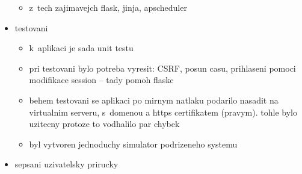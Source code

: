\begin{itemize}
\begin{itemize}
        \item z~tech zajimavejch flask, jinja, apscheduler
    \end{itemize}
    \item testovani
    \begin{itemize}
        \item k~aplikaci je sada unit testu
        \item pri testovani bylo potreba vyresit: CSRF, posun casu, prihlaseni pomoci modifikace session -- tady pomoh flaskc
        \item behem testovani se aplikaci po mirnym natlaku podarilo nasadit na virtualnim serveru, s~domenou a https certifikatem (pravym). tohle bylo uzitecny protoze to vodhalilo par chybek
        \item byl vytvoren jednoduchy simulator podrizeneho systemu
    \end{itemize}
    \item sepsani uzivatelsky prirucky
\end{itemize}